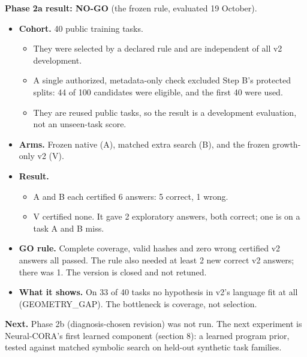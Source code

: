 \documentclass[11pt]{article}
\begin{document}
\textbf{Phase 2a result: NO-GO} (the frozen rule, evaluated 19 October).
\begin{itemize}
  \item \textbf{Cohort.} 40 public training tasks.
        \begin{itemize}
          \item They were selected by a declared rule and are independent of all v2 development.
          \item A single authorized, metadata-only check excluded Step B's protected splits: 44 of 100 candidates were
                eligible, and the first 40 were used.
          \item They are reused public tasks, so the result is a development evaluation, not an unseen-task score.
        \end{itemize}
  \item \textbf{Arms.} Frozen native (A), matched extra search (B), and the frozen growth-only v2 (V).
  \item \textbf{Result.}
        \begin{itemize}
          \item A and B each certified 6 answers: 5 correct, 1 wrong.
          \item V certified none. It gave 2 exploratory answers, both correct; one is on a task A and B miss.
        \end{itemize}
  \item \textbf{GO rule.} Complete coverage, valid hashes and zero wrong certified v2 answers all passed. The rule
        also needed at least 2 new correct v2 answers; there was 1. The version is closed and not retuned.
  \item \textbf{What it shows.} On 33 of 40 tasks no hypothesis in v2's language fit at all (GEOMETRY\_GAP). The
        bottleneck is coverage, not selection.
\end{itemize}

\textbf{Next.} Phase 2b (diagnosis-chosen revision) was not run. The next experiment is Neural-CORA's first learned
component (section 8): a learned program prior, tested against matched symbolic search on held-out synthetic task
families.
\end{document}

